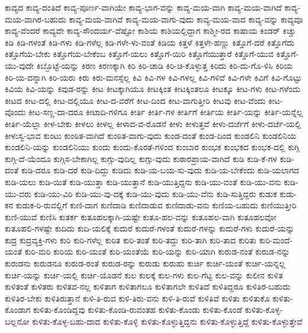 {ಕಾವ್ಯದ
ಕಾವ್ಯ-ದಂತಿದೆ
ಕಾವ್ಯ-ಪೂರ್ಣ-ವಾಗಿಯೇ
ಕಾವ್ಯ-ಭಾಗ-ವನ್ನು
ಕಾವ್ಯ-ಮಯ-ವಾಗಿ
ಕಾವ್ಯ-ಮಯ-ವಾಗಿದೆ
ಕಾವ್ಯ-ಮಯ-ವಾಗಿರ-ಬಹುದು
ಕಾವ್ಯ-ಮಯ-ವಾಗಿವೆ
ಕಾವ್ಯ-ಮಯ-ವಾಗು-ವುದು
ಕಾವ್ಯ-ಮಯ-ವಾದ
ಕಾವ್ಯ-ವನ್ನು
ಕಾವ್ಯವೂ
ಕಾವ್ಯ-ವೆಂದರೆ
ಕಾವ್ಯವೇ
ಕಾವ್ಯ-ಸೌಂದರ್ಯ-ವೆಷ್ಟೋ
ಕಾಶಿಯ
ಕಾಶಿಯಲ್ಲಿದ್ದಾಗ
ಕಾಶ್ಮೀ-ರದ
ಕಾಷಾಯ
ಕಿಂಡರ್
ಕಿಚ್ಚು
ಕಿಡಿ
ಕಿಡಿ-ಗಳಂತೆ
ಕಿಡಿ-ಗಳು
ಕಿಡಿ-ಗಳೆಲ್ಲ
ಕಿಡಿ-ಗಳೇ-ಳು-ವಂತೆ
ಕಿಡಿಯ
ಕಿತ್ತಳೆ
ಕಿತ್ತಳೇ-ಹಣ್ಣು
ಕಿತ್ತೊಗೆ-ದರೆ
ಕಿತ್ತೊಗೆದು
ಕಿತ್ತೊಗೆಯ-ಬೇಕು
ಕಿತ್ತೊಗೆಯ-ಬೇಕೆಂಬ
ಕಿತ್ತೊಗೆ-ಯಲು
ಕಿತ್ತೊಗೆ-ಯಿರಿ
ಕಿತ್ತೊಗೆಯುತ್ತಾರೆ
ಕಿತ್ತೊಗೆ-ಯುವ
ಕಿತ್ತೊಗೆ-ಯು-ವುದೇ
ಕಿಬ್ಬೊಟ್ಟೆ-ಯನ್ನು
ಕಿರಣ
ಕಿರಣಕ್ಕಾಗಿ
ಕಿರಿ
ಕಿರಿ-ಚಾಡಿ
ಕಿರಿ-ಚಿ-ಕೊಳ್ಳುತ್ತ
ಕಿರಿದು
ಕಿರಿ-ದು-ಗೊ-ಳಿಸಿ
ಕಿರಿಯ
ಕಿರಿ-ಯ-ದನ್ನಾಗಿ
ಕಿರಿ-ಯರು
ಕಿರು
ಕಿರು-ಮನಸ್ಸೆಲ್ಲ
ಕಿವಿ
ಕಿವಿ-ಗಳ
ಕಿವಿ-ಗಳಲ್ಲ
ಕಿವಿ-ಗಳಿವೆ
ಕಿವಿ-ಗಳೇ
ಕಿವಿಗೆ
ಕಿವಿ-ಗೊಟ್ಟು
ಕಿವಿಯ
ಕಿವಿ-ಯನ್ನು
ಕಿವುಡ-ರನ್ನು
ಕೀಟ
ಕೀಟಕ್ಕಾಗಿಯೂ
ಕೀಟಕ್ಕಿಂತ
ಕೀಟಕ್ಕಿಂತಲೂ
ಕೀಟಕ್ಕೂ
ಕೀಟ-ಗಳು
ಕೀಟ-ಗಳೆಂದು
ಕೀಟದ
ಕೀಟ-ದಲ್ಲಿ
ಕೀಟ-ದಲ್ಲಿಯೂ
ಕೀಟ-ದ-ವರೆಗೆ
ಕೀಟ-ದಿಂದ
ಕೀಟ-ವಾಗುತ್ತೀರಿ
ಕೀಟವು
ಕೀಟ-ವೆಂದು
ಕೀಟ-ವೊಂದು
ಕೀಟ-ಸಣ್ಣ-ದಾ-ದರೂ
ಕೀಟಾದಿ-ಗಳಿಗೂ
ಕೀರ್ತಿ
ಕೀರ್ತಿ-ಗಳ
ಕೀರ್ತಿಗೆ
ಕೀರ್ತಿಯ
ಕೀರ್ತಿ-ಯನ್ನು
ಕೀರ್ತಿ-ಯನ್ನೆಲ್ಲ
ಕೀರ್ತಿ-ಯೆಲ್ಲಾ
ಕೀಳ-ಬೇಕು
ಕೀಳಲು
ಕೀಳಲ್ಲ
ಕೀಳಾದ-ವ-ರೊಡನೆ
ಕೀಳು
ಕೀಳುತ್ತವೆ
ಕೀಳು-ದರ್ಜೆಗೆ
ಕೀಳು-ದರ್ಜೆ-ಯಲ್ಲಿ
ಕೀಳುಸ್ವ-ಭಾವ
ಕುಂಟು
ಕುಂಠಿತ-ವಾಗಿದೆ
ಕುಂಠಿತ-ವಾಗು-ವುದು
ಕುಂಡ-ದಂತೆ
ಕುಂಡ-ದಿಂದ
ಕುಂಡಲಿನಿ
ಕುಂಡಲಿನಿಯ
ಕುಂಡಲಿನಿ-ಯನ್ನು
ಕುಂಡಲಿನಿಯು
ಕುಂದು
ಕುಂದು-ಕೊರತೆ-ಗಳಿಂದ
ಕುಂಬಾರ
ಕುಂಭಕ
ಕುಂಭಕದ
ಕುಂಭಕ-ದಲ್ಲಿ
ಕುಗ್ಗಿ
ಕುಗ್ಗಿ-ದೆ-ಯೆಂದೂ
ಕುಗ್ಗಿಸ-ಬೇಕಾಗಿಲ್ಲ
ಕುಗ್ಗು-ವುದಿಲ್ಲ
ಕುಗ್ಗು-ವುದು
ಕುಠಾರಪ್ರಾಯ-ವಾಗಿದೆ
ಕುಡಿ
ಕುಡಿ-ಕೆ-ಗಳ
ಕುಡಿ-ದಂತೆ
ಕುಡಿ-ದರೂ
ಕುಡಿ-ದರೆ
ಕುಡಿ-ದಿದ್ದು
ಕುಡಿದು
ಕುಡಿ-ಯ-ಬಯ-ಸು-ವುದು
ಕುಡಿ-ಯ-ಬೇಕೆಂದು
ಕುಡಿ-ಯಲಾಗದ
ಕುಡಿ-ಯಲು
ಕುಡಿ-ಯಿತೆ
ಕುಡಿ-ಯುತ್ತಾ
ಕುಡಿ-ಯುತ್ತಾನೆ
ಕುಡಿ-ಯುತ್ತಿದ್ದನು
ಕುಡಿ-ಯು-ವಂತೆ
ಕುಡಿ-ಯು-ವನು
ಕುಡಿ-ಯು-ವರು
ಕುಡಿ-ಯು-ವಿರಿ
ಕುಡಿ-ಯು-ವು-ದಕ್ಕೆ
ಕುಡಿ-ಯು-ವುದು
ಕುಡಿ-ಯು-ವೆನು
ಕುಡಿ-ಸುತ್ತಿದ್ದರು
ಕುಡುಕ
ಕುಡು-ಕನ
ಕುಡುಕ-ರಿ-ರುವಲ್ಲಿಗೆ
ಕುಣಿ-ದಾಗ
ಕುಣಿದಾಡಿ
ಕುಣಿದಾಡುವ
ಕುಣಿದಾಡು-ವನು
ಕುಣಿಯ-ಬಹುದು
ಕುಣಿಯುತ್ತೀರಿ
ಕುಣಿ-ಯುವೆ
ಕುಣಿಸಿ
ಕುತರ್ಕ
ಕುತೂಹಲಕ್ಕಾಗಿ-ಯಷ್ಟೇ
ಕುತೂ-ಹಲ-ವನ್ನು
ಕುತೂಹಲ-ವಾಗಿ
ಕುತೂಹಲವೋ
ಕುತೂಹಲಿ-ಗಳಷ್ಟೇ
ಕುದಿದು
ಕುದಿ-ಯಲಿಕ್ಕೆ
ಕುದುರೆ
ಕುದುರೆ-ಗಳಂತೆ
ಕುದುರೆ-ಗಳನ್ನು
ಕುದುರೆ-ಗಳು
ಕುದುರೆ-ಯನ್ನು
ಕುದ್ರ
ಕುದ್ರವ್ಯಕ್ತಿ-ಗಳು
ಕುರಿ
ಕುರಿ-ಗಳೆಲ್ಲ
ಕುರಿತ
ಕುರಿ-ತಂತೆ
ಕುರಿ-ತದ್ದು
ಕುರಿ-ತಾಗಿ
ಕುರಿ-ತಾದ
ಕುರಿತು
ಕುರಿ-ಮಂದೆ-ಯಂತೆ
ಕುರಿ-ಮರಿ
ಕುರಿಯ
ಕುರಿ-ಯಂತೆ
ಕುರಿ-ಯಂತೆಯೆ
ಕುರಿ-ಯನ್ನು
ಕುರಿ-ಯಾಗಿ
ಕುರುಡ-ನಂತೆ
ಕುರುಡ-ನನ್ನು
ಕುರುಡನು
ಕುರುಡನೂ
ಕುರುಡ-ರಂತೆ
ಕುರುಡ-ರನ್ನು
ಕುರುಡು
ಕುರುಹು
ಕುರ್ಚಿ
ಕುರ್ಚಿ-ಯಂತೆ
ಕುರ್ಚಿ-ಯನ್ನಲ್ಲ
ಕುರ್ಚಿ-ಯನ್ನು
ಕುರ್ಚಿ-ಯಲ್ಲಿ
ಕುರ್ಚಿ-ಯೊಡನೆ
ಕುಲ
ಕುಲಕ್ಕೆ
ಕುಲ-ಗಳು
ಕುಲ-ಗೆಟ್ಟ
ಕುಲ-ವನ್ನು
ಕುಲೀನ
ಕುಳಿತ
ಕುಳಿತಂತೆ
ಕುಳಿತರು
ಕುಳಿತವ-ನಲ್ಲ
ಕುಳಿತಾಗ
ಕುಳಿತಾಗಲೂ
ಕುಳಿತಾಗಲೇ
ಕುಳಿತಿದೆ
ಕುಳಿತಿದ್ದರೂ
ಕುಳಿತಿರ-ಬಹುದು
ಕುಳಿತಿರ-ಬೇಕು
ಕುಳಿತಿರುತ್ತಾನೆ
ಕುಳಿ-ತಿ-ರುವ
ಕುಳಿ-ತಿರು-ವನು
ಕುಳಿ-ತಿ-ರುವೆ
ಕುಳಿತಿವೆ
ಕುಳಿತು
ಕುಳಿತುಕೊ
ಕುಳಿತು-ಕೊಂಡಾಗ
ಕುಳಿತು-ಕೊಂಡಿದ್ದವು
ಕುಳಿತು-ಕೊಂಡಿ-ರುವಂತಹ
ಕುಳಿತು-ಕೊಂಡು
ಕುಳಿತು-ಕೊಂಡೆ
ಕುಳಿತು-ಕೊಳ್ಳ-ಬಲ್ಲನೋ
ಕುಳಿತು-ಕೊಳ್ಳ-ಬಹು-ದಾದ
ಕುಳಿತು-ಕೊಳ್ಳಿ
ಕುಳಿತು-ಕೊಳ್ಳುತ್ತಿದ್ದನು
ಕುಳಿತು-ಕೊಳ್ಳುತ್ತಿದ್ದೆ
ಕುಳಿತು-ಕೊಳ್ಳುತ್ತೇವೆ
}
